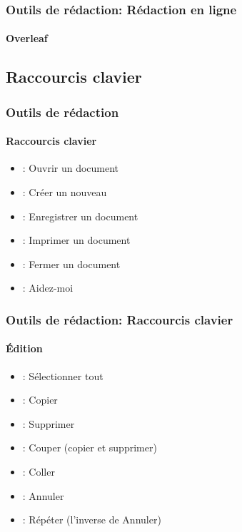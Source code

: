 \documentclass[xcolor=table]{beamer}
\begin{document}
\begin{frame}
\frametitle{Outils de rédaction: Rédaction en ligne}
\framesubtitle{Overleaf}

\begin{center}
\end{center}

\end{frame}

\subsection{Raccourcis clavier}

\begin{frame}
\frametitle{Outils de rédaction}
\framesubtitle{Raccourcis clavier}

\begin{itemize}
	\item {}: Ouvrir un document
	\item {}: Créer un nouveau
	\item {}: Enregistrer un document
	\item {}: Imprimer un document 
	\item {}: Fermer un document
	\item {}: Aidez-moi
\end{itemize}

\end{frame}

\begin{frame}
\frametitle{Outils de rédaction: Raccourcis clavier}
\framesubtitle{Édition}

\begin{itemize}
	\item {}: Sélectionner tout
	\item {}: Copier
	\item {}: Supprimer
	\item {}: Couper (copier et supprimer)
	\item {}: Coller
	\item {}: Annuler
	\item {}: Répéter (l'inverse de Annuler)
\end{itemize}

\end{frame}
\end{document}
